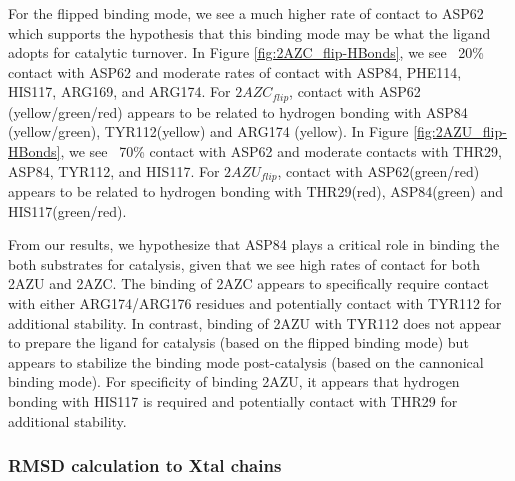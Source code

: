 \documentclass[fleqn,10pt]{wlscirep}
\begin{document}
For the flipped binding mode, we see a much higher rate of contact to ASP62 which supports the hypothesis that this binding mode may be what the ligand adopts for catalytic turnover.
In Figure \ref{fig:2AZC_flip-HBonds}, we see ~20\% contact with ASP62 and moderate rates of contact with ASP84, PHE114, HIS117, ARG169, and ARG174.
For $2AZC_{flip}$, contact with ASP62 (yellow/green/red) appears to be related to hydrogen bonding with ASP84 (yellow/green), TYR112(yellow) and ARG174 (yellow).
In Figure \ref{fig:2AZU_flip-HBonds}, we see ~70\% contact with ASP62 and moderate contacts with THR29, ASP84, TYR112, and HIS117.
For $2AZU_{flip}$, contact with ASP62(green/red) appears to be related to hydrogen bonding with THR29(red), ASP84(green) and HIS117(green/red).

From our results, we hypothesize that ASP84 plays a critical role in binding the both substrates for catalysis, given that we see high rates of contact for both 2AZU and 2AZC.
The binding of 2AZC appears to specifically require contact with either ARG174/ARG176 residues and potentially contact with TYR112 for additional stability.
In contrast, binding of 2AZU with TYR112 does not appear to prepare the ligand for catalysis (based on the flipped binding mode) but appears to stabilize the binding mode post-catalysis (based on the cannonical binding mode).
For specificity of binding 2AZU, it appears that hydrogen bonding with HIS117 is required and potentially contact with THR29 for additional stability.

\subsubsection{RMSD calculation to Xtal chains}

\end{document}
